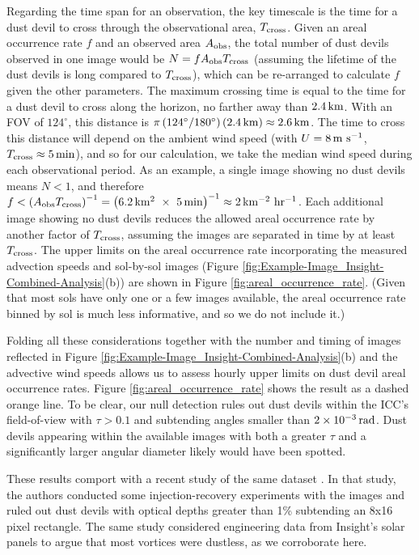 \documentclass{aastex63}
\begin{document}
Regarding the time span for an observation, the key timescale is the time for a dust devil to cross through the observational area, $T_{\rm cross}$. Given an areal occurrence rate $f$ and an observed area $A_{\rm obs}$, the total number of dust devils observed in one image would be $N = f A_{\rm obs} T_{\rm cross}$ (assuming the lifetime of the dust devils is long compared to $T_{\rm cross}$), which can be re-arranged to calculate $f$ given the other parameters. The maximum crossing time is equal to the time for a dust devil to cross along the horizon, no farther away than $2.4\,{\rm km}$. With an FOV of $124^\circ$, this distance is $\pi \left(124^\circ/180^\circ\right) \left( 2.4\,{\rm km} \right) \approx 2.6\,{\rm km}$. The time to cross this distance will depend on the ambient wind speed (with $U = 8\,{\rm m\ s^{-1}}$, $T_{\rm cross} \approx 5\,{\rm min}$), and so for our calculation, we take the median wind speed during each observational period. As an example, a single image showing no dust devils means $N < 1$, and therefore $f < \left( A_{\rm obs} T_{\rm cross}\right)^{-1} = \left( 6.2\,{\rm km^{2}}\ \times\ 5\,{\rm min}\right)^{-1} \approx 2\,{\rm km^{-2}\ hr^{-1}}$. Each additional image showing no dust devils reduces the allowed areal occurrence rate by another factor of $T_{\rm cross}$, assuming the images are separated in time by at least $T_{\rm cross}$. The upper limits on the areal occurrence rate incorporating the measured advection speeds and sol-by-sol images (Figure \ref{fig:Example-Image_Insight-Combined-Analysis}(b)) are shown in Figure \ref{fig:areal_occurrence_rate}. (Given that most sols have only one or a few images available, the areal occurrence rate binned by sol is much less informative, and so we do not include it.)

Folding all these considerations together with the number and timing of images reflected in Figure \ref{fig:Example-Image_Insight-Combined-Analysis}(b) and the advective wind speeds allows us to assess hourly upper limits on dust devil areal occurrence rates. Figure \ref{fig:areal_occurrence_rate} shows the result as a dashed orange line. To be clear, our null detection rules out dust devils within the ICC's field-of-view with $\tau > 0.1$ and subtending angles smaller than $2\times10^{-3}\,{\rm rad}$. Dust devils appearing within the available images with both a greater $\tau$ and a significantly larger angular diameter likely would have been spotted. 

These results comport with a recent study of the same dataset \citep{2021Icar..36414468L}. In that study, the authors conducted some injection-recovery experiments with the images and ruled out dust devils with optical depths greater than 1\% subtending an 8x16 pixel rectangle. The same study considered engineering data from Insight's solar panels to argue that most vortices were dustless, as we corroborate here.
\end{document}
